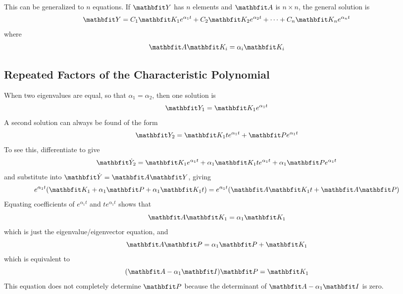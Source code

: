 This can be generalized to $n$ equations.  If $\vect{Y}$ has $n$ elements
and $\vect{A}$ is $n\times n$, the general solution is
$$\vect{Y}=C_1\vect{K}_1e^{\alpha_1t}+C_2\vect{K}_2e^{\alpha_2t}+\cdots
+C_n\vect{K}_ne^{\alpha_nt}$$
where
$$\vect{A}\vect{K}_i=\alpha_i\vect{K}_i$$

\subsection{Repeated Factors of the Characteristic Polynomial}

When two eigenvalues are equal, so that $\alpha_1=\alpha_2$, then one
solution is
$$\vect{Y}_1=\vect{K}_1e^{\alpha_1t}$$
A second solution can always be found of the form
$$\vect{Y}_2=\vect{K}_1te^{\alpha_1t}+\vect{P}e^{\alpha_1t}$$
To see this, differentiate to give
$$\vect{\dot{Y}}_2=\vect{K}_1e^{\alpha_1t}+\alpha_1\vect{K}_1te^{\alpha_1t}
+\alpha_1\vect{P}e^{\alpha_1t}$$
and substitute into $\vect{\dot{Y}}=\vect{A}\vect{Y}$, giving
$$e^{\alpha_1t}(\vect{K}_1+\alpha_1\vect{P}+\alpha_1\vect{K}_1t)
=e^{\alpha_1t}(\vect{A}\vect{K}_1t+\vect{A}\vect{P})$$
Equating coefficients of $e^{\alpha_1t}$ and $te^{\alpha_1t}$ shows that
$$\vect{A}\vect{K}_1=\alpha_1\vect{K}_1$$
which is just the eigenvalue/eigenvector equation, and
$$\vect{A}\vect{P}=\alpha_1\vect{P}+\vect{K}_1$$
which is equivalent to
$$(\vect{A}-\alpha_1\vect{I})\vect{P}=\vect{K}_1$$
This equation does not completely determine $\vect{P}$ because the
determinant of $\vect{A}-\alpha_1\vect{I}$ is zero.


